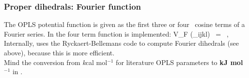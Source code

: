 \subsubsection{Proper dihedrals: Fourier function}
\label{subsec:Fourierdihedral}
The OPLS potential function is given as the first three
or four~\cite{Jorgensen2005a} cosine terms of a Fourier series.
In {\gromacs} the four term function is implemented:
\beq
V_{F} (\phi_{ijkl}) ~=~  ,
\eeq
Internally, {\gromacs}
uses the Ryckaert-Bellemans code
to compute Fourier dihedrals (see above), because this is more efficient.\\
 Mind the conversion from {\emph kcal mol$^{-1}$} for 
literature OPLS parameters to {\bf kJ mol$^{-1}$} in {\gromacs}.\\

